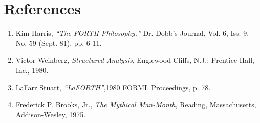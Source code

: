 \section{References}

\begin{enumerate}
\item Kim Harris, \emph{``The FORTH Philosophy,''} Dr. Dobb's Journal, Vol. 6, Iss. 9,
No. 59 (Sept. 81), pp. 6-11.

\item Victor Weinberg, \emph{Structured Analysis}, Englewood Cliffs, N.J.:
Prentice-Hall, Inc., 1980.

\item LaFarr Stuart, \emph{``LaFORTH''},1980 FORML Proceedings, p. 78.

\item Frederick P. Brooks, Jr., \emph{The Mythical Man-Month}, Reading,
Massachusetts, Addison-Wesley, 1975.
\end{enumerate}

